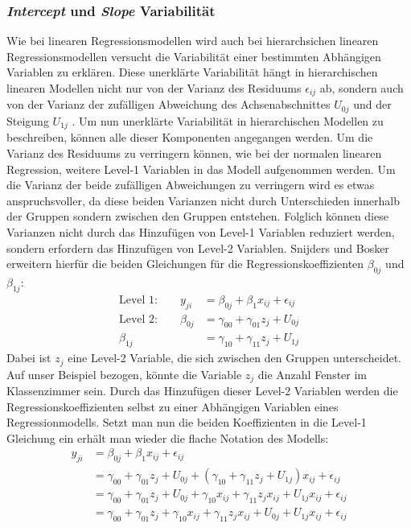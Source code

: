 \documentclass[12pt]{article}\usepackage[]{graphicx}\usepackage[]{color}
\begin{document}
\subsubsection{\textit{Intercept} und \textit{Slope} Variabilität} \label{section:variability}
Wie bei linearen Regressionsmodellen wird auch bei hierarchsichen linearen Regressionsmodellen versucht die Variabilität einer bestimmten Abhängigen Variablen zu erklären. Diese unerklärte Variabilität hängt in hierarchischen linearen Modellen nicht nur von der Varianz des Residuums $\epsilon_{ij}$ ab, sondern auch von der Varianz der zufälligen Abweichung des Achsenabschnittes $U_{0j}$ und der Steigung $U_{1j}$ \citep{SnijdersTomA.B2012Ma:a}. Um nun unerklärte Variabilität in hierarchischen Modellen zu beschreiben, können alle dieser Komponenten angegangen werden. Um die Varianz des Residuums zu verringern können, wie bei der normalen linearen Regression, weitere Level-1 Variablen in das Modell aufgenommen werden. Um die Varianz der beide zufälligen Abweichungen zu verringern wird es etwas anspruchsvoller, da diese beiden Varianzen nicht durch Unterschieden innerhalb der Gruppen sondern zwischen den Gruppen entstehen. Folglich können diese Varianzen nicht durch das Hinzufügen von Level-1 Variablen reduziert werden, sondern erfordern das Hinzufügen von Level-2 Variablen. Snijders und Bosker \citeyearpar{SnijdersTomA.B2012Ma:a} erweitern hierfür die beiden Gleichungen für die Regressionskoeffizienten $\beta_{0j}$ und $\beta_{1j}$:
\begin{equation} \label{eq:variance}
\begin{split}	
 \text{Level 1:}  \qquad y_{ji} & = \beta_{0j} + \beta_{1}x_{ij} + \epsilon_{ij}\\
 \text{Level 2:} \qquad \beta_{0j} & = \gamma_{00} + \gamma_{01}z_{j} + U_{0j}\\
 \beta_{1j} & = \gamma_{10} + \gamma_{11}z_{j} + U_{1j}
\end{split}	
\end{equation}
Dabei ist $z_{j}$ eine Level-2 Variable, die sich zwischen den Gruppen unterscheidet. Auf unser Beispiel bezogen, könnte die Variable $z_{j}$ die Anzahl Fenster im Klassenzimmer sein. Durch das Hinzufügen dieser Level-2 Variablen werden die Regressionskoeffizienten selbst zu einer Abhängigen Variablen eines Regressionmodells. Setzt man nun die beiden Koeffizienten in die Level-1 Gleichung ein erhält man wieder die flache Notation des Modells:
\begin{equation} \label{eq:flat_variance}
\begin{split}	
y_{ji} & = \beta_{0j} + \beta_{1}x_{ij} + \epsilon_{ij}\\
& = \gamma_{00} + \gamma_{01}z_{j} + U_{0j} + (\gamma_{10} + \gamma_{11}z_{j} + U_{1j})x_{ij} + \epsilon_{ij}\\
& = \gamma_{00} + \gamma_{01}z_{j} + U_{0j} + \gamma_{10}x_{ij} + \gamma_{11}z_{j}x_{ij} + U_{1j}x_{ij} + \epsilon_{ij}\\
& = \gamma_{00} + \gamma_{01}z_{j} + \gamma_{10}x_{ij} + \gamma_{11}z_{j}x_{ij} + U_{0j} + U_{1j}x_{ij} + \epsilon_{ij}\\
\end{split}	
\end{equation} 
\end{document}
